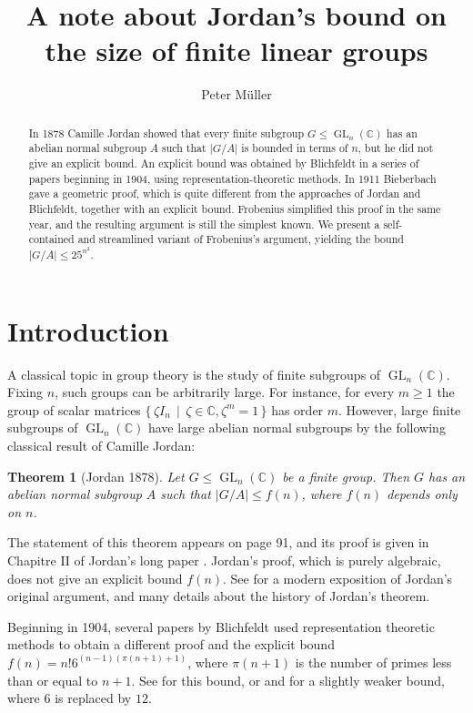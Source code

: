 \documentclass[12pt]{amsart}
\title{A note about Jordan's bound on the size of finite linear groups}
\author{Peter M\"uller}
\theoremstyle{plain}
\newtheorem{theorem}{Theorem}[section]
\theoremstyle{definition}
\numberwithin{equation}{section}
\newcommand*{\abs}[1]{\lvert#1\rvert}
\newcommand*{\defset}[2]{\{\,#1\,\mid\,#2\,\}}
\newcommand*{\CC}{\mathbb C}
\DeclareMathOperator{\GL}{GL}
\begin{document}
\begin{abstract}
  In 1878 Camille Jordan showed that every finite subgroup
  $G\le\GL_n(\CC)$ has an abelian normal subgroup $A$ such that
  $\abs{G/A}$ is bounded in terms of $n$, but he did not give an
  explicit bound. An explicit bound was obtained by Blichfeldt in a
  series of papers beginning in 1904, using representation-theoretic
  methods. In 1911 Bieberbach gave a geometric proof, which is quite
  different from the approaches of Jordan and Blichfeldt, together
  with an explicit bound. Frobenius simplified this proof in the same
  year, and the resulting argument is still the simplest known. We
  present a self-contained and streamlined variant of Frobenius's
  argument, yielding the bound $\abs{G/A}\le25^{n^2}$.
\end{abstract}
\maketitle
\section{Introduction}
A classical topic in group theory is the study of finite subgroups of
$\GL_n(\CC)$. Fixing $n$, such groups can be arbitrarily large. For
instance, for every $m\ge1$ the group of scalar matrices
$\defset{\zeta I_n}{\zeta\in\CC, \zeta^m=1}$ has order $m$. However,
large finite subgroups of $\GL_n(\CC)$ have large abelian normal
subgroups by the following classical result of Camille Jordan:
\begin{theorem}[Jordan 1878]
  Let $G\le\GL_n(\CC)$ be a finite group. Then $G$ has an abelian
  normal subgroup $A$ such that $\abs{G/A}\le f(n)$, where $f(n)$
  depends only on $n$.
\end{theorem}
The statement of this theorem appears on page 91, and its proof is
given in Chapitre II of Jordan's long paper
\cite{Jordan:GLnC}. Jordan's proof, which is purely algebraic, does
not give an explicit bound $f(n)$. See
\cite{Breuillard:OriginalJordan} for a modern exposition of Jordan's
original argument, and many details about the history of Jordan's
theorem.

Beginning in 1904, several papers by Blichfeldt used representation
theoretic methods to obtain a different proof and the explicit bound
$f(n)=n!6^{(n-1)(\pi(n+1)+1)}$, where $\pi(n+1)$ is the number of
primes less than or equal to $n+1$. See \cite[\S30]{Dornhoff:A} for
this bound, or \cite[Theorem (14.12)]{Isaacs} and \cite[\S70]{Speiser}
for a slightly weaker bound, where $6$ is replaced by $12$.
\end{document}
